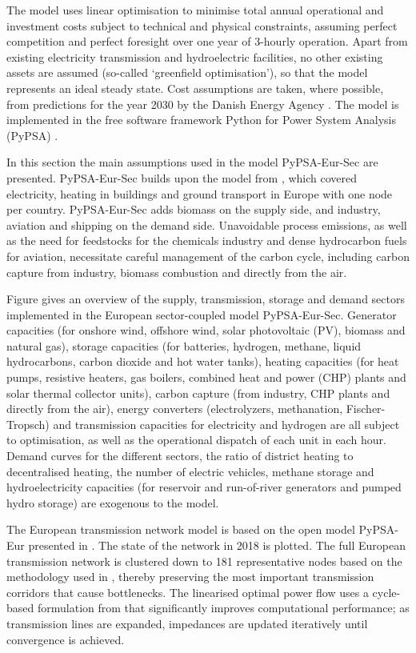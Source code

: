 The model uses linear optimisation to minimise total annual operational and
investment costs subject to technical and physical constraints, assuming perfect
competition and perfect foresight over one year of 3-hourly operation. Apart
from existing electricity transmission and hydroelectric facilities, no other
existing assets are assumed (so-called `greenfield optimisation'), so that the
model represents an ideal steady state.  Cost assumptions are taken, where
possible, from predictions for the year 2030 by the Danish Energy Agency
\cite{dea2019}. The model is implemented in the free software framework Python
for Power System Analysis (PyPSA) \cite{brownPyPSAPython2018}.

In this section the main assumptions used in the model PyPSA-Eur-Sec are
presented. PyPSA-Eur-Sec builds upon the model from \cite{brown2018}, which
covered electricity, heating in buildings and ground transport in Europe with
one node per country. PyPSA-Eur-Sec adds biomass on the supply side, and
industry, aviation and shipping on the demand side. Unavoidable process
emissions, as well as the need for feedstocks for the chemicals industry and
dense hydrocarbon fuels for aviation, necessitate careful management of the
carbon cycle, including carbon capture from industry, biomass combustion and
directly from the air.

Figure gives an overview of the supply, transmission,
storage and demand sectors implemented in the European sector-coupled model
PyPSA-Eur-Sec. Generator capacities (for onshore wind, offshore wind, solar
photovoltaic (PV), biomass and natural gas), storage capacities (for batteries,
hydrogen, methane, liquid hydrocarbons, carbon dioxide and hot water tanks),
heating capacities (for heat pumps, resistive heaters, gas boilers, combined
heat and power (CHP) plants and solar thermal collector units), carbon capture
(from industry, CHP plants and directly from the air), energy converters
(electrolyzers, methanation, Fischer-Tropsch) and transmission capacities for
electricity and hydrogen are all subject to optimisation, as well as the
operational dispatch of each unit in each hour. Demand curves for the different
sectors, the ratio of district heating to decentralised heating, the number of
electric vehicles, methane storage and hydroelectricity capacities (for
reservoir and run-of-river generators and pumped hydro storage) are exogenous to
the model.

The European transmission network model is based on the open model PyPSA-Eur
presented in \cite{horschPyPSAEurOpen2018}. The state of the network in 2018 is plotted. The full European transmission network is clustered
down to 181 representative nodes based on the methodology used in
\cite{Hoersch2017}, thereby preserving the most important transmission corridors
that cause bottlenecks. The linearised optimal power flow uses a cycle-based
formulation from \cite{horschLinearOptimal2018} that significantly improves computational
performance; as transmission lines are expanded, impedances are updated
iteratively until convergence is achieved.

